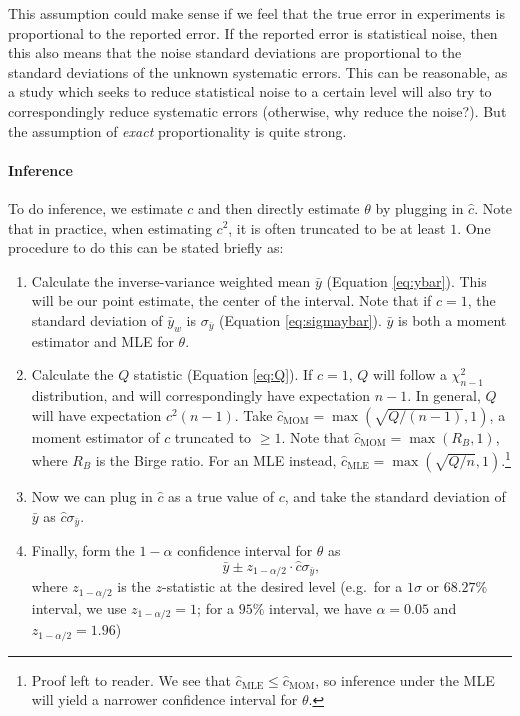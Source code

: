 \documentclass[letterpaper,12pt]{article}
\begin{document}
This assumption could make sense if we feel that the true error in experiments is proportional to the reported error. If the reported error is statistical noise, then this also means that the noise standard deviations are proportional to the standard deviations of the unknown systematic errors. This can be reasonable, as a study which seeks to reduce statistical noise to a certain level will also try to correspondingly reduce systematic errors (otherwise, why reduce the noise?). But the assumption of \emph{exact} proportionality is quite strong.

\paragraph{Inference}

To do inference, we estimate $c$ and then directly estimate $\theta$ by plugging in $\hat c$. Note that in practice, when estimating $c^2$, it is often truncated to be at least $1$. One procedure to do this can be stated briefly as:

\begin{enumerate}
\item
  Calculate the inverse-variance weighted mean $\bar{y}$ (Equation \ref{eq:ybar}). This will be our point estimate, the center of the interval. Note that if $c=1$, the standard deviation of $\bar{y}_w$ is $\sigma_{\bar y}$ (Equation \ref{eq:sigmaybar}). $\bar{y}$ is both a moment estimator and MLE for $\theta$.
\item
  Calculate the $Q$ statistic (Equation \ref{eq:Q}). If $c=1$, $Q$ will follow a $\chi^2_{n-1}$ distribution, and will correspondingly have expectation $n-1$. In general, $Q$ will have expectation $c^2(n-1)$. Take $\hat{c}_{\mathrm{MOM}}=\max(\sqrt{Q/(n-1)},1)$, a moment estimator of $c$ truncated to $\geq 1$. Note that $\hat{c}_{\mathrm{MOM}}=\max(R_B,1)$, where $R_B$ is the Birge ratio. For an MLE instead, $\hat{c}_{\mathrm{MLE}}=\max(\sqrt{Q/n},1)$.\footnote{Proof left to reader. We see that $\hat{c}_\mathrm{MLE}\leq \hat{c}_{\mathrm{MOM}}$, so inference under the MLE will yield a narrower confidence interval for $\theta$.}
\item
  Now we can plug in $\hat c$ as a true value of $c$, and take the standard deviation of $\bar{y}$ as $\hat c\sigma_{\bar y}$.
\item
  Finally, form the $1-\alpha$ confidence interval for $\theta$ as \[\bar{y}\pm z_{1-{\alpha/2}}\cdot \hat c\sigma_{\bar y},\] where $z_{1-\alpha/2}$ is the $z$-statistic at the desired level (e.g.~for a $1\sigma$ or $68.27\%$ interval, we use $z_{1-\alpha/2}=1$; for a $95\%$ interval, we have $\alpha=0.05$ and $z_{1-\alpha/2}=1.96$)
\end{enumerate}
\end{document}
